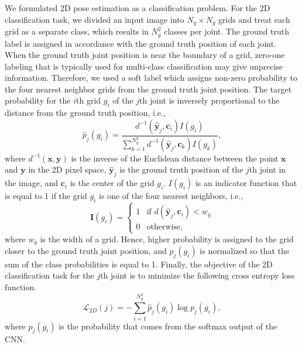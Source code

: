 \documentclass[runningheads]{llncs}
\begin{document}
We formulated 2D pose estimation as a classification problem. For the 2D classification task, we divided an input image into $N_g \times N_g$ grids and treat each grid as a separate class, which results in $N_{g}^2$ classes per joint. The ground truth label is assigned in accordance with the ground truth position of each joint. When the ground truth joint position is near the boundary of a grid, zero-one labeling that is typically used for multi-class classification may give unprecise information. Therefore, we used a soft label which assigns non-zero probability to the four nearest neighbor grids from the ground truth joint position. The target probability for the $i$th grid $g_i$ of the $j$th joint is inversely proportional to the distance from the ground truth position, i.e.,
\begin{equation}\label{eq1}
  \hat{p}_j (g_i) = \frac{d^{-1} (\mathbf{\hat{y}}_j, \mathbf{c}_i ) I( g_i )}{ \sum_{k=1}^{N_{g}^2} d^{-1} (\mathbf{\hat{y}}_j, \mathbf{c}_k ) I( g_k )} ,
\end{equation}
where $d^{-1}(\mathbf{x},\mathbf{y})$ is the inverse of the Euclidean distance between the point $\mathbf{x}$ and $\mathbf{y}$ in the 2D pixel space, $\mathbf{\hat{y}}_j$ is the ground truth position of the $j$th joint in the image, and $\mathbf{c}_i$ is the center of the grid $g_i$. $I( g_i )$ is an indicator function that is equal to 1 if the grid $g_i$ is one of the four nearest neighbors, i.e.,
\begin{equation}\label{eq1_2}
  \mathbf{I}( g_i ) = \begin{cases}
                        1 & \mbox{if }  d (\mathbf{\hat{y}}_j, \mathbf{c}_i ) < w_g \\
                        0 & \mbox{otherwise},
                      \end{cases}
\end{equation}
where $w_g$ is the width of a grid. Hence, higher probability is assigned to the grid closer to the ground truth joint position, and $\hat{p}_j (g_i)$ is normalized so that the sum of the class probabilities is equal to 1. Finally, the objective of the 2D classification task for the $j$th joint is to minimize the following cross entropy loss function.
\begin{equation}\label{eq2}
  \mathcal{L}_{2D}(j) = - \sum_{i=1}^{N_{g}^2} \hat{p}_j (g_i) \log {p_j (g_i)},
\end{equation}
where $p_j (g_i)$ is the probability that comes from the softmax output of the CNN.
\end{document}

